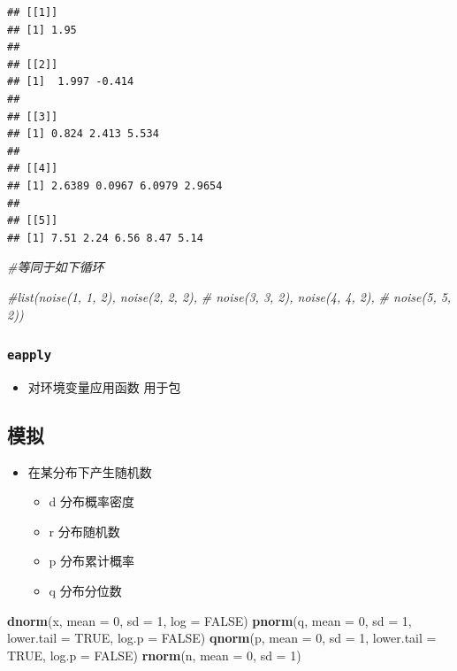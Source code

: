 \documentclass[
]{book}
\newenvironment{Shaded}{\begin{snugshade}}{\end{snugshade}}
\newcommand{\CommentTok}[1]{\textcolor[rgb]{0.56,0.35,0.01}{\textit{#1}}}
\newcommand{\DataTypeTok}[1]{\textcolor[rgb]{0.13,0.29,0.53}{#1}}
\newcommand{\DecValTok}[1]{\textcolor[rgb]{0.00,0.00,0.81}{#1}}
\newcommand{\KeywordTok}[1]{\textcolor[rgb]{0.13,0.29,0.53}{\textbf{#1}}}
\newcommand{\NormalTok}[1]{#1}
\newcommand{\OtherTok}[1]{\textcolor[rgb]{0.56,0.35,0.01}{#1}}
\providecommand{\tightlist}{%
  \setlength{\itemsep}{0pt}\setlength{\parskip}{0pt}}
\begin{document}
\begin{verbatim}
## [[1]]
## [1] 1.95
## 
## [[2]]
## [1]  1.997 -0.414
## 
## [[3]]
## [1] 0.824 2.413 5.534
## 
## [[4]]
## [1] 2.6389 0.0967 6.0979 2.9654
## 
## [[5]]
## [1] 7.51 2.24 6.56 8.47 5.14
\end{verbatim}

\begin{Shaded}
\begin{Highlighting}[]
\CommentTok{#等同于如下循环}

\CommentTok{#list(noise(1, 1, 2), noise(2, 2, 2),}
\CommentTok{#    noise(3, 3, 2), noise(4, 4, 2),}
\CommentTok{#    noise(5, 5, 2))}
\end{Highlighting}
\end{Shaded}

\hypertarget{eapply}{%
\subsubsection{\texorpdfstring{\texttt{eapply}}{eapply}}\label{eapply}}

\begin{itemize}
\tightlist
\item
  对环境变量应用函数 用于包
\end{itemize}

\hypertarget{ux6a21ux62df}{%
\subsection{模拟}\label{ux6a21ux62df}}

\begin{itemize}
\tightlist
\item
  在某分布下产生随机数

  \begin{itemize}
  \tightlist
  \item
    d 分布概率密度
  \item
    r 分布随机数
  \item
    p 分布累计概率
  \item
    q 分布分位数
  \end{itemize}
\end{itemize}

\begin{Shaded}
\begin{Highlighting}[]
\KeywordTok{dnorm}\NormalTok{(x, }\DataTypeTok{mean =} \DecValTok{0}\NormalTok{, }\DataTypeTok{sd =} \DecValTok{1}\NormalTok{, }\DataTypeTok{log =} \OtherTok{FALSE}\NormalTok{)}
\KeywordTok{pnorm}\NormalTok{(q, }\DataTypeTok{mean =} \DecValTok{0}\NormalTok{, }\DataTypeTok{sd =} \DecValTok{1}\NormalTok{, }\DataTypeTok{lower.tail =} \OtherTok{TRUE}\NormalTok{, }\DataTypeTok{log.p =} \OtherTok{FALSE}\NormalTok{)}
\KeywordTok{qnorm}\NormalTok{(p, }\DataTypeTok{mean =} \DecValTok{0}\NormalTok{, }\DataTypeTok{sd =} \DecValTok{1}\NormalTok{, }\DataTypeTok{lower.tail =} \OtherTok{TRUE}\NormalTok{, }\DataTypeTok{log.p =} \OtherTok{FALSE}\NormalTok{)}
\KeywordTok{rnorm}\NormalTok{(n, }\DataTypeTok{mean =} \DecValTok{0}\NormalTok{, }\DataTypeTok{sd =} \DecValTok{1}\NormalTok{)}
\end{Highlighting}
\end{Shaded}
\end{document}
